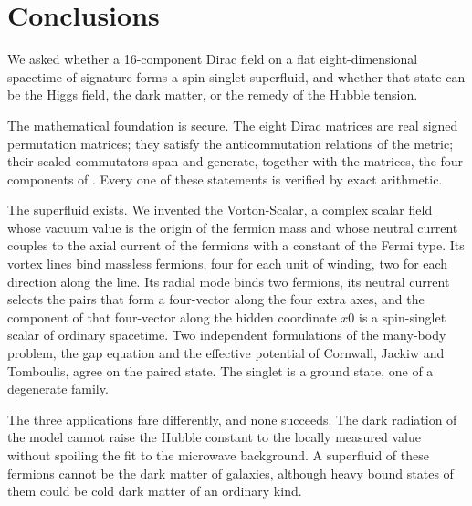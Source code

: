 \section{Conclusions}
\label{sec:concl}

We asked whether a 16-component Dirac field on a flat eight-dimensional spacetime of signature
 forms a spin-singlet superfluid, and whether that state can be the Higgs field,
the dark matter, or the remedy of the Hubble tension.

The mathematical foundation is secure. The eight Dirac matrices are real signed permutation
matrices; they satisfy the anticommutation relations of the metric; their scaled commutators span
 and generate, together with the matrices, the four components of
.  Every one of these statements is verified by exact
arithmetic.

The superfluid exists. We invented the Vorton-Scalar, a complex scalar field whose vacuum value is
the origin of the fermion mass and whose neutral current couples to the axial current of the
fermions with a constant of the Fermi type. Its vortex lines bind massless fermions, four for each
unit of winding, two for each direction along the line. Its radial mode binds two fermions, its neutral current
selects the pairs that form a four-vector along the four extra axes, and the component of that
four-vector along the hidden coordinate $x0$ is a spin-singlet scalar of ordinary spacetime. Two
independent formulations of the many-body problem, the gap equation and the effective potential of
Cornwall, Jackiw and Tomboulis, agree on the paired state. The singlet is a ground state, one of a
degenerate family.

The three applications fare differently, and none succeeds.  The dark radiation of the model cannot raise the Hubble constant to the
locally measured value without spoiling the fit to the microwave background. A superfluid of these
fermions cannot be the dark matter of galaxies, although heavy bound states of them could be cold
dark matter of an ordinary kind.

